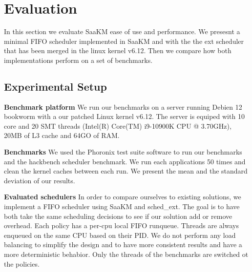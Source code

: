 \section{Evaluation}

\par In this section we evaluate SaaKM ease of use and performance. We presesnt a minimal FIFO scheduler implemented in SaaKM and with the the ext scheduler\cite{schedext} that has been merged in the linux kernel v6.12. Then we compare how both implementations perform on a set of benchmarks. \newline

\subsection{Experimental Setup}
\par \textbf{Benchmark platform} We run our benchmarks on a server running Debien 12 bookworm with a our patched Linux kernel v6.12. The server is equiped with 10 core and 20 SMT threads (Intel(R) Core(TM) i9-10900K CPU @ 3.70GHz), 20MB of L3 cache and 64GO of RAM. \newline

\par \textbf{Benchmarks} We used the Phoronix test suite\cite{phoronix} software to run our benchmarks and the hackbench\cite{hackbench} scheduler benchmark. We run each applications 50 times and clean the kernel caches between each run. We present the mean and the standard deviation of our results. \newline

\par \textbf{Evaluated schedulers} In order to compare ourselves to existing solutions, we implement a FIFO scheduler using SaaKM and sched\_ext. The goal is to have both take the same scheduling decisions to see if our solution add or remove overhead. Each policy has a per-cpu local FIFO runqueue. Threads are always enqueued on the same CPU based on their PID. We do not perform any load balancing to simplify the design and to have more consistent results and have a more deterministic behabior. Only the threads of the benchmarks are switched ot the policies.\newline


